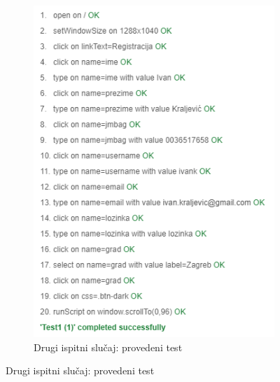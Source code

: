 \begin{figure}[H]
\begin{subfigure}{.5\textwidth}
 					\includegraphics[scale=0.5]{slike/test2.png}
 					\caption{Drugi ispitni slučaj: provedeni test}
 					\label{fig:drugiIspitniSlucajTest}%
 				\end{subfigure}
 			\end{figure}
 			
